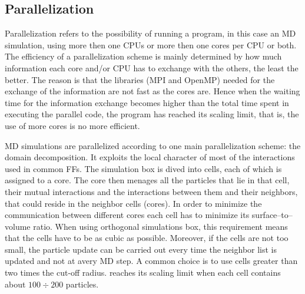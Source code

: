 \subsection{Parallelization}
Parallelization refers to the possibility of running a program, in this case an \ac{MD} simulation, using more 
then one CPUs or more then one cores per CPU or both. The efficiency of a parallelization scheme is mainly 
determined by how much information each core and/or CPU has to exchange with the others, the least the better. 
The reason is that the libraries (MPI and OpenMP) needed for the exchange of the information are not fast as the 
cores are. Hence when the waiting time for the information exchange becomes higher than the total time spent in 
executing the parallel code, the program has reached its scaling limit, that is, the use of more cores is no more 
efficient.

\ac{MD} simulations are parallelized according to one main parallelization scheme: the domain decomposition. It 
exploits the local character of most of the interactions used in common \acp{FF}. The simulation box is dived 
into cells, each of which is assigned to a core. The core then menages all the particles that lie in that cell, 
their mutual interactions and the interactions between them and their neighbors, that could reside in the 
neighbor cells (cores). In order to minimize the communication between different cores each cell has to minimize 
its surface--to--volume ratio. When using orthogonal simulations box, this requirement means that the cells have 
to be as cubic as possible. Moreover, if the cells are not too small, the particle update can be carried out 
every time the neighbor list is updated and not at avery \ac{MD} step. A common choice is to use cells greater 
than two times the cut-off radius. \gromacs reaches its scaling limit when each cell contains about 
$100 \div 200$ particles.


